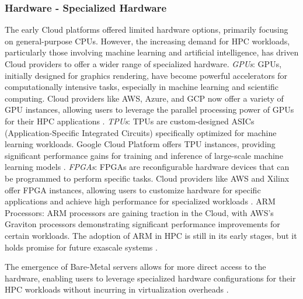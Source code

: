     \subsubsection{Hardware - Specialized Hardware}
    The early Cloud platforms offered limited hardware options, primarily focusing on general-purpose CPUs. However, the increasing demand for HPC workloads, particularly those involving machine learning and artificial intelligence, has driven Cloud providers to offer a wider range of specialized hardware.
    \textit{GPUs}: GPUs, initially designed for graphics rendering, have become powerful accelerators for computationally intensive tasks, especially in machine learning and scientific computing. Cloud providers like AWS, Azure, and GCP now offer a variety of GPU instances, allowing users to leverage the parallel processing power of GPUs for their HPC applications \cite{giannoutakis_evaluation_2021, balis_scientific_2021, malla_hpc_2019, fernandez_evaluation_2022}.
    \textit{TPUs}: TPUs are custom-designed ASICs (Application-Specific Integrated Circuits) specifically optimized for machine learning workloads. Google Cloud Platform offers TPU instances, providing significant performance gains for training and inference of large-scale machine learning models \cite{pena-monferrer_hpc-cloud_2021}.
    \textit{FPGAs}: FPGAs are reconfigurable hardware devices that can be programmed to perform specific tasks. Cloud providers like AWS and Xilinx offer FPGA instances, allowing users to customize hardware for specific applications and achieve high performance for specialized workloads \cite{giannoutakis_evaluation_2021}.
    ARM Processors: ARM processors are gaining traction in the Cloud, with AWS's Graviton processors demonstrating significant performance improvements for certain workloads. The adoption of ARM in HPC is still in its early stages, but it holds promise for future exascale systems \cite{fernandez_evaluation_2022, nowicki_performance_2021}.

    The emergence of Bare-Metal servers allows for more direct access to the hardware, enabling users to leverage specialized hardware configurations for their HPC workloads without incurring in virtualization overheads \cite{guidi_10_2021, cho_possibility_2019,kumar_containerized_2022, kuity_investigating_2023}.


